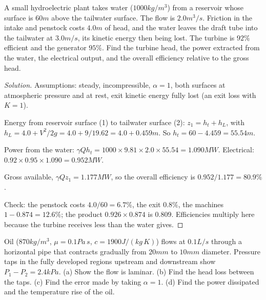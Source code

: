 \begin{example}
A small hydroelectric plant takes water ($1000\unit{kg/m^3}$) from a reservoir whose surface is $60\unit{m}$ above the tailwater surface. The flow is $2.0\unit{m^3/s}$. Friction in the intake and penstock costs $4.0\unit{m}$ of head, and the water leaves the draft tube into the tailwater at $3.0\unit{m/s}$, its kinetic energy then being lost. The turbine is $92\%$ efficient and the generator $95\%$. Find the turbine head, the power extracted from the water, the electrical output, and the overall efficiency relative to the gross head.
\end{example}

\begin{proof}[Solution]
Assumptions: steady, incompressible, $\alpha = 1$, both surfaces at atmospheric pressure and at rest, exit kinetic energy fully lost (an exit loss with $K = 1$).

Energy from reservoir surface (1) to tailwater surface (2): $z_1 = h_t + h_L$, with $h_L = 4.0 + V^2/2g = 4.0 + 9/19.62 = 4.0 + 0.459\unit{m}$. So $h_t = 60 - 4.459 = 55.54\unit{m}$.

Power from the water: $\gamma Qh_t = 1000\times9.81\times2.0\times55.54 = 1.090\unit{MW}$. Electrical: $0.92\times0.95\times1.090 = 0.952\unit{MW}$.

Gross available, $\gamma Qz_1 = 1.177\unit{MW}$, so the overall efficiency is $0.952/1.177 = 80.9\%$.

Check: the penstock costs $4.0/60 = 6.7\%$, the exit $0.8\%$, the machines $1 - 0.874 = 12.6\%$; the product $0.926\times0.874$ is $0.809$. Efficiencies multiply here because the turbine receives less than the water gives.
\end{proof}

\begin{example}
Oil ($870\unit{kg/m^3}$, $\mu = 0.1\unit{Pa\,s}$, $c = 1900\unit{J/(kg\,K)}$) flows at $0.1\unit{L/s}$ through a horizontal pipe that contracts gradually from $20\unit{mm}$ to $10\unit{mm}$ diameter. Pressure taps in the fully developed regions upstream and downstream show $P_1 - P_2 = 2.4\unit{kPa}$. (a) Show the flow is laminar. (b) Find the head loss between the taps. (c) Find the error made by taking $\alpha = 1$. (d) Find the power dissipated and the temperature rise of the oil.
\end{example}

